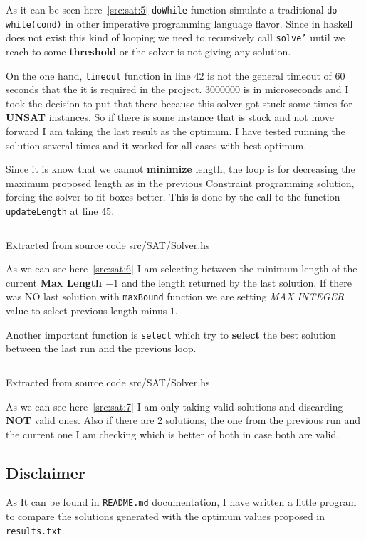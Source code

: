 \documentclass[12pt, a4paper]{article}
\begin{document}
As it can be seen here~\ref{src:sat:5} \texttt{doWhile} function simulate a traditional \texttt{do   while(cond)} in other imperative programming language flavor. Since in \acrshort{haskell} does not exist this kind of looping we need to recursively call \texttt{solve'} until we reach to some \textbf{threshold} or the solver is not giving any solution.

On the one hand, \texttt{timeout} function in line $42$ is not the general timeout of $60$ seconds that the it is required in the project. $3000000$ is in microseconds and I took the decision to put that there because this solver got stuck some times for \textbf{UNSAT} instances. So if there is some instance that is stuck and not move forward I am taking the last result as the optimum. I have tested running the solution several times and it worked for all cases with best optimum.

Since it is know that we cannot \textbf{minimize} length, the loop is for decreasing the maximum proposed length as in the previous Constraint programming solution, forcing the solver to fit boxes better. This is done by the call to the function \texttt{updateLength} at line $45$.

\begin{listing}[H]
  \inputminted[firstline=108, lastline=114, linenos, breaklines]{haskell}{../src/SAT/Solver.hs}
  \caption{Extracted from source code src/SAT/Solver.hs}
  \label{src:sat:6}
\end{listing}

As we can see here~\ref{src:sat:6} I am selecting between the minimum length of the current \textbf{Max Length $-1$} and the length returned by the last solution. If there was NO last solution with \texttt{maxBound} function we are setting \textit{MAX INTEGER} value to select previous length minus $1$.

Another important function is \texttt{select} which try to \textbf{select} the best solution between the last run and the previous loop.

\begin{listing}[H]
  \inputminted[firstline=55, lastline=74, linenos, breaklines]{haskell}{../src/SAT/Solver.hs}
  \caption{Extracted from source code src/SAT/Solver.hs}
  \label{src:sat:7}
\end{listing}

As we can see here~\ref{src:sat:7} I am only taking valid solutions and discarding \textbf{NOT} valid ones. Also if there are 2 solutions, the one from the previous run and the current one I am checking which is better of both in case both are valid.

\subsection{Disclaimer}
As It can be found in \texttt{README.md} documentation, I have written a little program to compare the solutions generated with the optimum values proposed in \texttt{results.txt}.



\end{document}
